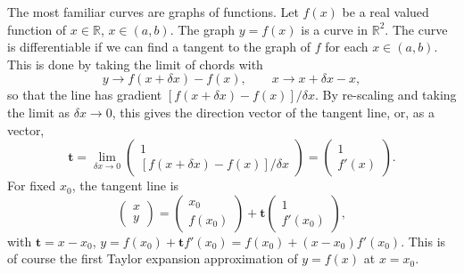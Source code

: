 \documentclass[letter-paper]{tufte-book}
\newcommand{\tb}{\boldsymbol{t}}
\begin{document}
The most familiar curves are graphs of functions. Let $f(x)$ be a real valued
function of $x\in\mathbb{R}$, $x\in(a,b)$. The graph $y=f(x)$ is a curve in
$\mathbb{R}^2$. The curve is differentiable if we can find a tangent to the
graph of $f$ for each $x\in(a,b)$. This is done by taking the limit of chords
with
\begin{equation*}
	y \to f(x+\delta x)-f(x),\qquad x \to x+\delta x - x,
\end{equation*}
so that the line has gradient $[f(x+\delta x)-f(x)]/\delta x$. By re-scaling and
taking the limit as $\delta x\rightarrow0$, this gives the direction vector of
the tangent line, or, as a vector,
\begin{equation*}
	\tb=\lim_{\delta x\rightarrow0}\left(\begin{matrix}
	1\\ [f(x+\delta x)-f(x)]/\delta x\end{matrix}\right)=\left(\begin{matrix}
	1\\ f'(x)\end{matrix}\right).
\end{equation*}
For fixed $x_0$, the tangent line is
\begin{equation}
	\begin{pmatrix}x\\ y\end{pmatrix}=\begin{pmatrix}x_0 \\ f(x_0)\end{pmatrix}
	+\tb\begin{pmatrix}1\\ f'(x_0)\end{pmatrix},
\end{equation}
with $\tb=x-x_0$, $y=f(x_0)+\tb f'(x_0)=f(x_0)+(x-x_0)f'(x_0)$. This is of
course the first Taylor expansion approximation of $y=f(x)$ at $x=x_0$.
\end{document}
